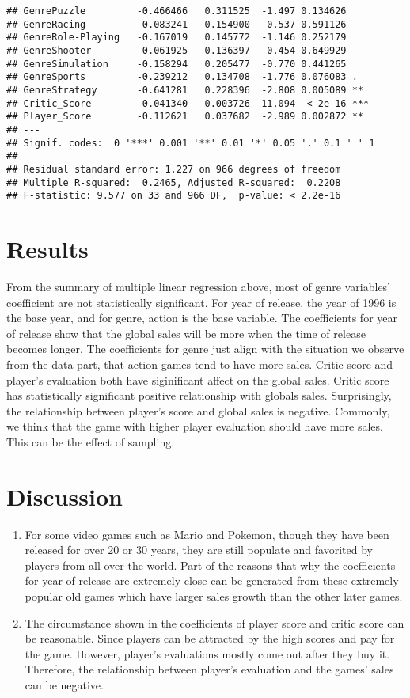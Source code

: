 \documentclass[
]{article}
\begin{document}
\begin{verbatim}
## GenrePuzzle         -0.466466   0.311525  -1.497 0.134626    
## GenreRacing          0.083241   0.154900   0.537 0.591126    
## GenreRole-Playing   -0.167019   0.145772  -1.146 0.252179    
## GenreShooter         0.061925   0.136397   0.454 0.649929    
## GenreSimulation     -0.158294   0.205477  -0.770 0.441265    
## GenreSports         -0.239212   0.134708  -1.776 0.076083 .  
## GenreStrategy       -0.641281   0.228396  -2.808 0.005089 ** 
## Critic_Score         0.041340   0.003726  11.094  < 2e-16 ***
## Player_Score        -0.112621   0.037682  -2.989 0.002872 ** 
## ---
## Signif. codes:  0 '***' 0.001 '**' 0.01 '*' 0.05 '.' 0.1 ' ' 1
## 
## Residual standard error: 1.227 on 966 degrees of freedom
## Multiple R-squared:  0.2465, Adjusted R-squared:  0.2208 
## F-statistic: 9.577 on 33 and 966 DF,  p-value: < 2.2e-16
\end{verbatim}

\hypertarget{results}{%
\section{Results}\label{results}}

From the summary of multiple linear regression above, most of genre
variables' coefficient are not statistically significant. For year of
release, the year of 1996 is the base year, and for genre, action is the
base variable. The coefficients for year of release show that the global
sales will be more when the time of release becomes longer. The
coefficients for genre just align with the situation we observe from the
data part, that action games tend to have more sales. Critic score and
player's evaluation both have siginificant affect on the global sales.
Critic score has statistically significant positive relationship with
globals sales. Surprisingly, the relationship between player's score and
global sales is negative. Commonly, we think that the game with higher
player evaluation should have more sales. This can be the effect of
sampling.

\hypertarget{discussion}{%
\section{Discussion}\label{discussion}}

\begin{enumerate}
\def\labelenumi{\arabic{enumi})}
\item
  For some video games such as Mario and Pokemon, though they have been
  released for over 20 or 30 years, they are still populate and
  favorited by players from all over the world. Part of the reasons that
  why the coefficients for year of release are extremely close can be
  generated from these extremely popular old games which have larger
  sales growth than the other later games.
\item
  The circumstance shown in the coefficients of player score and critic
  score can be reasonable. Since players can be attracted by the high
  scores and pay for the game. However, player's evaluations mostly come
  out after they buy it. Therefore, the relationship between player's
  evaluation and the games' sales can be negative.
\end{enumerate}
\end{document}
